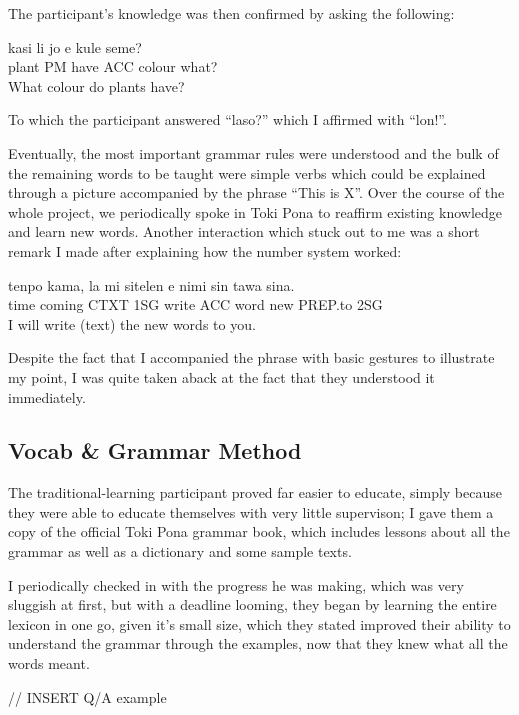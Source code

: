 \documentclass[a4paper,10pt]{article}
\begin{document}
The participant's knowledge was then confirmed by asking the following:

\begin{exe}
 \ex
 \gll kasi li jo e kule seme? \\
 plant PM have ACC colour what?\\
 \glt What colour do plants have?
\end{exe}

To which the participant answered ``laso?'' which I affirmed with ``lon!''.

Eventually, the most important grammar rules were understood and the bulk of the remaining words to
be taught were simple verbs which could be explained through a picture accompanied by the phrase
``This is X''. Over the course of the whole project, we periodically spoke in Toki Pona to reaffirm
existing knowledge and learn new words. Another interaction which stuck out to me was a short
remark I made after explaining how the number system worked:

\begin{exe}
 \ex
 \gll tenpo kama, la mi sitelen e nimi sin tawa sina. \\
 time coming CTXT 1SG write ACC word new PREP.to 2SG \\
 \glt I will write (text) the new words to you.
\end{exe}

Despite the fact that I accompanied the phrase with basic gestures to illustrate my point,
I was quite taken aback at the fact that they understood it immediately.


\subsection{Vocab \& Grammar Method}
The traditional-learning participant proved far easier to educate, simply because they were able to
educate themselves with very little supervison; I gave them a copy of the official Toki Pona grammar
book, which includes lessons about all the grammar as well as a dictionary and some sample texts.

I periodically checked in with the progress he was making, which was very sluggish at first, but with
a deadline looming, they began by learning the entire lexicon in one go, given it's small size, which
they stated improved their ability to understand the grammar through the examples, now that they knew
what all the words meant.

// INSERT Q/A example
\end{document}
